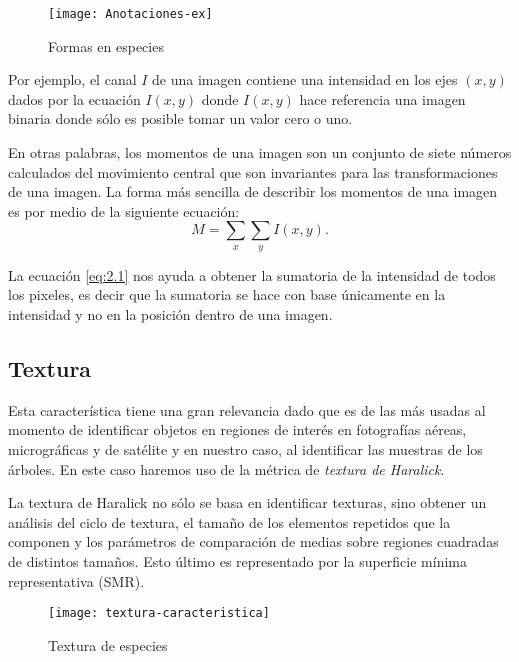\begin{figure}[h!]
  \centering
  \begin{minipage}[b]{0.4\textwidth}
    \texttt{[image: Anotaciones-ex]}
    \caption{Formas en especies}
  \end{minipage}
\end{figure}

Por ejemplo, el canal $I$ de una imagen contiene una intensidad en los ejes $(x,y)$ dados por la ecuación $I(x,y)$ donde $I(x,y)$ hace referencia una imagen binaria donde sólo es posible tomar un valor cero o uno. 

En otras palabras, los momentos de una imagen son un conjunto de siete números calculados del movimiento central que son invariantes para las transformaciones de una imagen. La forma más sencilla de describir los momentos de una imagen es por medio de la siguiente ecuación: \begin{equation}
\label{eq:2.1}
 M = \sum_{x}\sum_{y} I(x,y).
\end{equation}

La ecuación \ref{eq:2.1} nos ayuda a obtener la sumatoria de la intensidad de todos los pixeles, es decir que la sumatoria se hace con base únicamente en la intensidad y no en la posición dentro de una imagen.

\subsection{Textura} 
Esta característica tiene una gran relevancia dado que es de las más usadas al momento de identificar objetos en regiones de interés en fotografías aéreas, micrográficas y de satélite y en nuestro caso, al identificar las muestras de los árboles. En este caso haremos uso de la métrica de \emph{textura de Haralick}.

La textura de Haralick no sólo se basa en identificar texturas, sino obtener un análisis del ciclo de textura, el tamaño de los elementos repetidos que la componen y los parámetros de comparación de medias sobre regiones cuadradas de distintos tamaños. Esto último es representado por la superficie mínima representativa (SMR).

\bigskip
\begin{figure}[h!]
  \centering
  \begin{minipage}[b]{0.7\textwidth}
    \texttt{[image: textura-caracteristica]}
    \caption{Textura de especies}
  \end{minipage}
\end{figure}


